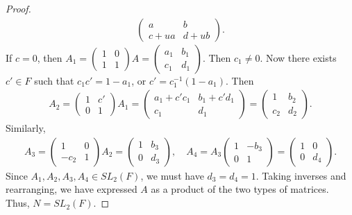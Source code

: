 \begin{proof}
\begin{align}
\begin{pmatrix}
            a & b \\ c + ua & d + ub
        \end{pmatrix}.
    \end{align}
    If $c = 0$, then $A_{1} = \begin{pmatrix}
        1 & 0 \\ 1 & 1
    \end{pmatrix} A = \begin{pmatrix}
        a_{1} & b_{1} \\ c_{1} & d_{1}
    \end{pmatrix}$. Then $c_{1} \neq 0$. Now there exists $c' \in F$ such that $c_{1} c' = 1-a_{1}$, or $c' = c_{1}^{-1}(1-a_{1})$. Then
    \begin{align}
        A_{2} = \begin{pmatrix}
            1 & c' \\ 0 & 1
        \end{pmatrix} A_{1} = \begin{pmatrix}
            a_{1} + c'c_{1} & b_{1} + c'd_{1} \\ c_{1} & d_{1}
        \end{pmatrix} = \begin{pmatrix}
            1 & b_{2} \\ c_{2} & d_{2}
        \end{pmatrix}.
    \end{align}
    Similarly,
    \begin{align}
        A_{3} = \begin{pmatrix}
            1 & 0 \\ -c_{2} & 1
        \end{pmatrix} A_{2} = \begin{pmatrix}
            1 & b_{3} \\ 0 & d_{3}
        \end{pmatrix}, \quad A_{4} = A_{3} \begin{pmatrix}
            1 & -b_{3} \\ 0 & 1
        \end{pmatrix} = \begin{pmatrix}
            1 & 0 \\ 0 & d_{4}
        \end{pmatrix}.
    \end{align}
    Since $A_{1},A_{2},A_{3},A_{4} \in SL_{2}(F)$, we must have $d_{3} = d_{4} = 1$. Taking inverses and rearranging, we have expressed $A$ as a product of the two types of matrices. Thus, $N = SL_{2}(F)$.
\end{proof}

